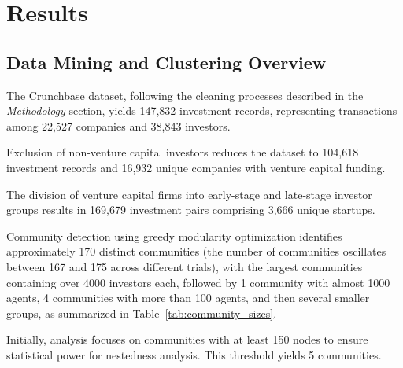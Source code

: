 \section{Results}

\subsection{Data Mining and Clustering Overview}

\newcommand{\numCompanies}{22,527}
\newcommand{\numInvestors}{38,843}
\newcommand{\numInvestments}{147,832}
\newcommand{\numFundingRounds}{268,283}

The Crunchbase dataset, following the cleaning processes described in the \textit{Methodology} section, yields \numInvestments{} investment records, representing transactions among \numCompanies{} companies and \numInvestors{} investors.


\newcommand{\numVCInvestments}{104,618}
\newcommand{\numCompaniesWithVCFund}{16,932}

Exclusion of non-venture capital investors reduces the dataset to \numVCInvestments{} investment records and \numCompaniesWithVCFund{} unique companies with venture capital funding.

\newcommand{\invPairs}{169,679}
\newcommand{\invPairsUniqueStartups}{3,666}

The division of venture capital firms into early-stage and late-stage investor groups results in \invPairs{} investment pairs comprising \invPairsUniqueStartups{} unique startups.


\newcommand{\numCommunities}{170}
\newcommand{\numTopCommunities}{5}
\newcommand{\numCommunitiesThreshold}{150}

Community detection using greedy modularity optimization identifies approximately \numCommunities{} distinct communities (the number of communities oscillates between 167 and 175 across different trials), with the largest communities containing over 4000 investors each, followed by 1 community with almost 1000 agents, 4 communities with more than 100 agents, and then several smaller groups, as summarized in Table~\ref{tab:community_sizes}.

Initially, analysis focuses on communities with at least \numCommunitiesThreshold{} nodes to ensure statistical power for nestedness analysis. This threshold yields \numTopCommunities{} communities.

